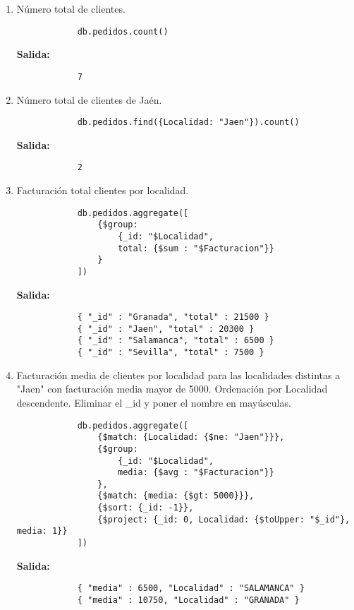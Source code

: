 \begin{enumerate}
	\item Número total de clientes.
		\begin{lstlisting}
			db.pedidos.count()
		\end{lstlisting}
		\textbf{Salida:}
		\begin{lstlisting}
			7
		\end{lstlisting}
		
	\item Número total de clientes de Jaén.
		\begin{lstlisting}
			db.pedidos.find({Localidad: "Jaen"}).count()
		\end{lstlisting}
		\textbf{Salida:}
		\begin{lstlisting}
			2
		\end{lstlisting}
		
	\item Facturación total clientes por localidad.
		\begin{lstlisting}
			db.pedidos.aggregate([
				{$group:
					{_id: "$Localidad",
					total: {$sum : "$Facturacion"}}
				}
			])
		\end{lstlisting}
		\textbf{Salida:}
		\begin{lstlisting}
			{ "_id" : "Granada", "total" : 21500 }
			{ "_id" : "Jaen", "total" : 20300 }
			{ "_id" : "Salamanca", "total" : 6500 }
			{ "_id" : "Sevilla", "total" : 7500 }
		\end{lstlisting}
		
	\item Facturación media de clientes por localidad para las localidades distintas a "Jaen" con facturación media mayor de 5000. Ordenación por Localidad descendente. Eliminar el \_id y poner el nombre en mayúsculas.
		\begin{lstlisting}
			db.pedidos.aggregate([
				{$match: {Localidad: {$ne: "Jaen"}}},
				{$group:
					{_id: "$Localidad",
					media: {$avg : "$Facturacion"}}
				},
				{$match: {media: {$gt: 5000}}},
				{$sort: {_id: -1}},
				{$project: {_id: 0, Localidad: {$toUpper: "$_id"}, media: 1}}
			])
		\end{lstlisting}
		\textbf{Salida:}
		\begin{lstlisting}
			{ "media" : 6500, "Localidad" : "SALAMANCA" }
			{ "media" : 10750, "Localidad" : "GRANADA" }
		\end{lstlisting}
		

\end{enumerate}
